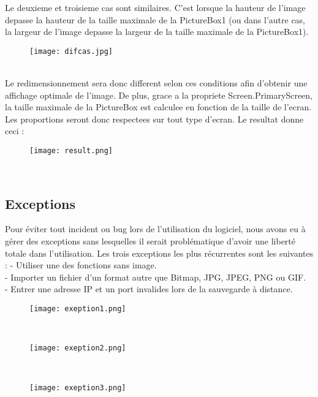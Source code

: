 \documentclass{article}
\begin{document}
Le deuxieme et troisieme cas sont similaires. C'est lorsque la hauteur de l'image depasse
la hauteur de la taille maximale de la PictureBox1 (ou dans l'autre cas, la largeur
de l'image depasse la largeur de la taille maximale de la PictureBox1).\\
\begin{figure}[hp]
	\centering
    \texttt{[image: difcas.jpg]}
	 \label{differents cas.}
\end{figure}
\\
Le redimensionnement sera donc different selon ces conditions afin d'obtenir une affichage
optimale de l'image. De plus, grace a la propriete Screen.PrimaryScreen, la
taille maximale de la PictureBox est calculee en fonction de la taille de l'ecran. Les
proportions seront donc respectees sur tout type d'ecran. Le resultat donne ceci :\\
\begin{figure}[hp]
	\centering
    \texttt{[image: result.png]}
	 \label{Redimesnionement}
\end{figure}
\newpage
\\

              \subsection{Exceptions}
Pour éviter tout incident ou bug lors de l’utilisation du logiciel, nous avons eu à
gérer des exceptions sans lesquelles il serait problématique d’avoir une liberté totale dans l’utilisation. Les trois exceptions les plus récurrentes sont les suivantes :
- Utiliser une des fonctions sans image.\\
- Importer un fichier d’un format autre que Bitmap, JPG, JPEG, PNG ou GIF.\\
- Entrer une adresse IP et un port invalides lors de la sauvegarde à distance.\\

\begin{figure}[hp]
	\centering
    \texttt{[image: exeption1.png]}
	 \label{Exception}
\end{figure}
\\
\begin{figure}[hp]
	\centering
    \texttt{[image: exeption2.png]}
	 \label{Exception}
\end{figure}
\\
\newpage
\begin{figure}[hp]
	\centering
    \texttt{[image: exeption3.png]}
	 \label{Exception}
\end{figure}\\
\end{document}
